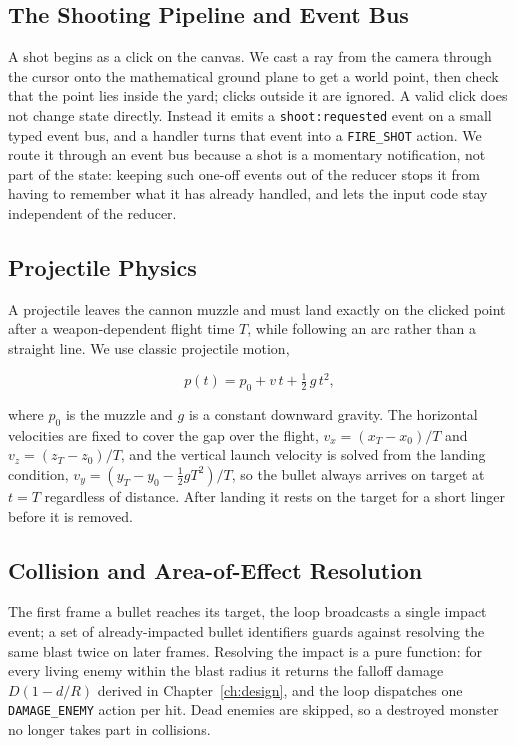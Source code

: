 \documentclass[12pt,a4paper]{report}
\begin{document}
\subsection{The Shooting Pipeline and Event Bus}

A shot begins as a click on the canvas. We cast a ray from the camera through the
cursor onto the mathematical ground plane to get a world point, then check that
the point lies inside the yard; clicks outside it are ignored. A valid click does
not change state directly. Instead it emits a \texttt{shoot:requested} event on a
small typed event bus, and a handler turns that event into a \texttt{FIRE\_SHOT}
action. We route it through an event bus because a shot is a momentary
notification, not part of the state: keeping such one-off events out of the
reducer stops it from having to remember what it has already handled, and lets
the input code stay independent of the reducer.

\subsection{Projectile Physics}

A projectile leaves the cannon muzzle and must land exactly on the clicked point
after a weapon-dependent flight time $T$, while following an arc rather than a
straight line. We use classic projectile motion,

\begin{equation}
p(t) = p_0 + v\,t + \tfrac{1}{2}\,g\,t^2,
\end{equation}

where $p_0$ is the muzzle and $g$ is a constant downward gravity. The horizontal
velocities are fixed to cover the gap over the flight, $v_x=(x_T-x_0)/T$ and
$v_z=(z_T-z_0)/T$, and the vertical launch velocity is solved from the landing
condition, $v_y=(y_T-y_0-\tfrac12 g T^2)/T$, so the bullet always arrives on
target at $t=T$ regardless of distance. After landing it rests on the target for
a short linger before it is removed.

\subsection{Collision and Area-of-Effect Resolution}

The first frame a bullet reaches its target, the loop broadcasts a single impact
event; a set of already-impacted bullet identifiers guards against resolving the
same blast twice on later frames. Resolving the impact is a pure function: for
every living enemy within the blast radius it returns the falloff damage
$D(1-d/R)$ derived in Chapter~\ref{ch:design}, and the loop dispatches one
\texttt{DAMAGE\_ENEMY} action per hit. Dead enemies are skipped, so a destroyed
monster no longer takes part in collisions.
\end{document}
